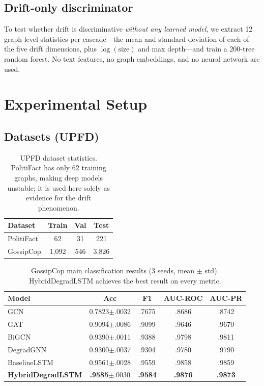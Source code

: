 \documentclass[10pt,twocolumn]{article}
\begin{document}
\subsection{Drift-only discriminator}
\label{sec:discrim}

To test whether drift is discriminative \emph{without any learned model}, we
extract 12 graph-level statistics per cascade---the mean and standard deviation
of each of the five drift dimensions, plus $\log(\text{size})$ and max
depth---and train a 200-tree random forest. No text features, no graph
embeddings, and no neural network are used.

\section{Experimental Setup}
\label{sec:setup}

\subsection{Datasets (UPFD)}
\label{sec:datasets}

\begin{table}[t]
  \centering
  \caption{UPFD dataset statistics. PolitiFact has only 62 training graphs,
  making deep models unstable; it is used here solely as evidence for the drift
  phenomenon.}
  \label{tab:datasets}
  \begin{tabular}{lccc}
    \toprule
    Dataset & Train & Val & Test \\
    \midrule
    PolitiFact & 62 & 31 & 221 \\
    GossipCop  & 1{,}092 & 546 & 3{,}826 \\
    \bottomrule
  \end{tabular}
\end{table}

\begin{table}[t]
  \centering
  \caption{GossipCop main classification results (3 seeds, mean $\pm$ std).
  HybridDegradLSTM achieves the best result on every metric.}
  \label{tab:main}
  \small
  \begin{tabular}{lcccc}
    \toprule
    Model & Acc & F1 & AUC-ROC & AUC-PR \\
    \midrule
    GCN        & 0.7823$\pm$.0032 & .7675 & .8686 & .8742 \\
    GAT        & 0.9094$\pm$.0086 & .9099 & .9646 & .9670 \\
    BiGCN      & 0.9390$\pm$.0011 & .9388 & .9798 & .9811 \\
    DegradGNN  & 0.9300$\pm$.0037 & .9304 & .9780 & .9790 \\
    BaselineLSTM & 0.9561$\pm$.0028 & .9559 & .9858 & .9859 \\
    \midrule
    \textbf{HybridDegradLSTM} & \textbf{.9585}$\pm$.0030 & \textbf{.9584}
      & \textbf{.9876} & \textbf{.9873} \\
    \bottomrule
  \end{tabular}
\end{table}
\end{document}
